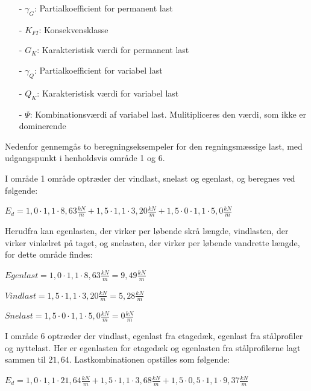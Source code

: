 \begin{itemize}
	\item[-] $\gamma_G$: Partialkoefficient for permanent last
	\item[-] $K_{FI}$: Konsekvensklasse
	\item[-] $G_K$: Karakteristisk værdi for permanent last
	\item[-] $\gamma_Q$: Partialkoefficient for variabel last
	\item[-] $Q_K$: Karakteristisk værdi for variabel last
	\item[-] $\Psi$: Kombinationsværdi af variabel last. Mulitipliceres den værdi, som ikke er dominerende 
\end{itemize}

Nedenfor gennemgås to beregningseksempeler for den regningsmæssige last, med udgangspunkt i henholdsvis område 1 og 6. 

I område 1 område optræder der vindlast, snelast og egenlast, og beregnes ved følgende:

\begin{center}
	$E_d = 1,\!0 \cdot 1,\!1 \cdot 8,\!63 \frac{kN}{m} + 1,\!5 \cdot 1,\!1 \cdot 3,\!20 \frac{kN}{m} + 1,\!5 \cdot 0 \cdot 1,\!1 \cdot 5,\!0 \frac{kN}{m}$
\end{center}

Herudfra kan egenlasten, der virker per løbende skrå længde, vindlasten, der virker vinkelret på taget, og snelasten, der virker per løbende vandrette længde, for dette område findes:

\begin{center}
	$Egenlast = 1,\!0 \cdot 1,\!1 \cdot 8,\!63 \frac{kN}{m} = 9,\!49 \frac{kN}{m}$
\end{center}

\begin{center}
	$Vindlast = 1,\!5 \cdot 1,\!1 \cdot 3,\!20 \frac{kN}{m} = 5,\!28 \frac{kN}{m}$
\end{center}

\begin{center}
	$Snelast = 1,\!5 \cdot 0 \cdot 1,\!1 \cdot 5,\!0 \frac{kN}{m} = 0 \frac{kN}{m}$ 
\end{center}

I område 6 optræder der vindlast, egenlast fra etagedæk, egenlast fra stålprofiler og nyttelast. Her er egenlasten for etagedæk og egenlasten fra stålprofilerne lagt sammen til $21,\!64$. Lastkombinationen opstilles som følgende:

\begin{center}
	$E_d = 1,\!0 \cdot 1,\!1 \cdot 21,\!64 \frac{kN}{m} + 1,\!5 \cdot 1,\!1 \cdot 3,\!68 \frac{kN}{m} + 1,\!5 \cdot 0,\!5 \cdot 1,\!1 \cdot 9,\!37 \frac{kN}{m}$
\end{center}

